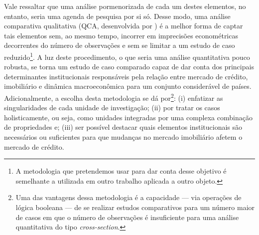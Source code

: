 Vale ressaltar que uma análise pormenorizada de cada um destes elementos, no entanto, seria uma agenda de pesquisa por si só. Desse modo, uma análise comparativa qualitativa (QCA, desenvolvida por \textcite{ragin_comparative_1989}) é a melhor forma de captar tais elementos sem, ao mesmo tempo, incorrer em imprecisões econométricas decorrentes do número de observações e sem se limitar a um estudo de caso reduzido\footnote{A metodologia que pretendemos usar para dar conta desse objetivo é semelhante a utilizada em outro trabalho \cite{petrini_comparacao_2019} aplicada a outro objeto.}. A luz deste procedimento, o que seria uma análise quantitativa pouco robusta, se torna um estudo de caso comparado capaz de dar conta dos principais determinantes institucionais responsáveis pela relação entre mercado de crédito, imobiliário e dinâmica macroeconômica para um conjunto considerável de países. Adicionalmente, a escolha desta metodologia se dá por\footnote{Uma das vantagens dessa metodologia é a capacidade --- via operações de lógica booleana --- de se realizar estudos comparativos para um número maior de casos em que o número de observações é insuficiente para uma análise quantitativa do tipo \textit{cross-section}.}: (i) enfatizar as singularidades de cada unidade de investigação; (ii) por tratar os casos holisticamente, ou seja, como unidades integradas por uma complexa combinação de propriedades e; (iii) ser possível destacar quais elementos institucionais são necessários ou suficientes para que mudanças no mercado imobiliário afetem o mercado de crédito.

